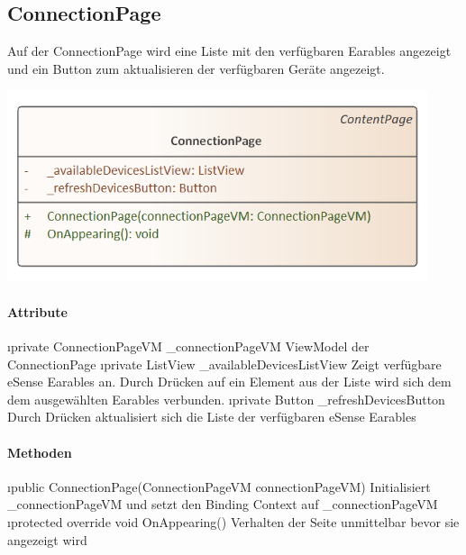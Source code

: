 \documentclass[../entwurf.tex]{subfiles}
\begin{document}
\subsection{ConnectionPage}
Auf der ConnectionPage wird eine Liste mit den verfügbaren Earables angezeigt und ein Button zum aktualisieren der verfügbaren Geräte angezeigt. 
\begin{center}
	\includegraphics[page=1,width=350pt,keepaspectratio]{../uml_klassen/View/ConnectionPage.png}
\end{center}
\paragraph{Attribute}
\begin{itemize}
	\i{private ConnectionPageVM \_connectionPageVM} ViewModel der ConnectionPage
	\i{private ListView \_availableDevicesListView} Zeigt verfügbare eSense Earables an. Durch Drücken auf ein Element aus der Liste wird sich dem dem ausgewählten Earables verbunden. 
	\i{private Button \_refreshDevicesButton} Durch Drücken aktualisiert sich die Liste der verfügbaren eSense Earables
\end{itemize}

\paragraph{Methoden}
\begin{itemize}
	\i{public ConnectionPage(ConnectionPageVM connectionPageVM)} Initialisiert \_connectionPageVM und setzt den Binding Context 			auf \_connectionPageVM
	\i{protected override void OnAppearing()} Verhalten der Seite unmittelbar bevor sie angezeigt wird
\end{itemize}
\end{document}

